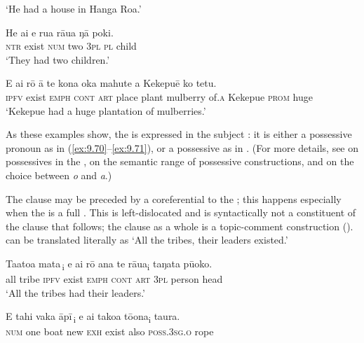 \glt 
‘He had a house in Hanga Roa.’ \textstyleExampleref{[R250.249]} 
\z

\ea\label{ex:9.71}
\gll He ai e rua rāua ŋā poki. \\
\textsc{ntr} exist \textsc{num} two \textsc{3pl} \textsc{pl} child \\

\glt 
‘They had two children.’ \textstyleExampleref{[R211.002]} 
\z

\ea\label{ex:9.72}
\gll E ai rō {\ꞌ}ā te kona {\ꞌ}oka mahute {\ꞌ}a Kekepuē ko tetu.\\
\textsc{ipfv} exist \textsc{emph} \textsc{cont} \textsc{art} place plant mulberry of\textsc{.a} Kekepue \textsc{prom} huge\\

\glt
‘Kekepue had a huge plantation of mulberries.’ \textstyleExampleref{[Fel-1978.008]}
\z

As these examples show, the  is expressed in the subject : it is either a possessive pronoun as in (\ref{ex:9.70}–\ref{ex:9.71}), or a possessive  as in . (For more details, see  on possessives in the ,  on the semantic range of possessive constructions, and  on the choice between \textit{o} and \textit{{\ꞌ}a}.)

The clause may be preceded by a  coreferential to the ; this happens especially when the  is a full . This  is left-dislocated and is syntactically not a constituent of the clause that follows; the clause as a whole is a topic-comment construction ().  can be translated literally as ‘All the tribes, their leaders existed.’

\ea\label{ex:9.73}
\gll {\ob}Ta{\ꞌ}ato{\ꞌ}a mata\,{\cb}\textsubscript{\textup{i}} e ai rō {\ꞌ}ana te rāua\textsubscript{\textup{i}} taŋata pū{\ꞌ}oko. \\
{\db}all tribe \textsc{ipfv} exist \textsc{emph} \textsc{cont} \textsc{art} \textsc{3pl} person head \\

\glt 
‘All the tribes had their leaders.’ \textstyleExampleref{[R371.006]} 
\z

\ea\label{ex:9.74}
\gll {\ob}E tahi vaka {\ꞌ}āpī\,{\cb}\textsubscript{\textup{i}} e ai tako{\ꞌ}a tō{\ꞌ}ona\textsubscript{\textup{i}} taura. \\
{\db}\textsc{num} one boat new \textsc{exh} exist also \textsc{poss.3sg.o} rope \\


